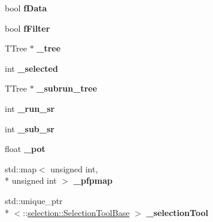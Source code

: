 \begin{DoxyCompactItemize}
\item 
\hypertarget{classNeutrinoSelectionFilter_a892272d67c27d81277fc16bc48ab451d}{bool {\bfseries f\-Data}}\label{classNeutrinoSelectionFilter_a892272d67c27d81277fc16bc48ab451d}

\item 
\hypertarget{classNeutrinoSelectionFilter_ae8811aa168d2e336c75e980a4dd2a2b8}{bool {\bfseries f\-Filter}}\label{classNeutrinoSelectionFilter_ae8811aa168d2e336c75e980a4dd2a2b8}

\item 
\hypertarget{classNeutrinoSelectionFilter_a4489c5bb4d7c9ff3002627bf6a4c28aa}{T\-Tree $\ast$ {\bfseries \-\_\-tree}}\label{classNeutrinoSelectionFilter_a4489c5bb4d7c9ff3002627bf6a4c28aa}

\item 
\hypertarget{classNeutrinoSelectionFilter_a50c00840d977534f08a8405d3b6db8a7}{int {\bfseries \-\_\-selected}}\label{classNeutrinoSelectionFilter_a50c00840d977534f08a8405d3b6db8a7}

\item 
\hypertarget{classNeutrinoSelectionFilter_a6fd2c4dbb3f1d6b4f618bde415bb10a6}{T\-Tree $\ast$ {\bfseries \-\_\-subrun\-\_\-tree}}\label{classNeutrinoSelectionFilter_a6fd2c4dbb3f1d6b4f618bde415bb10a6}

\item 
\hypertarget{classNeutrinoSelectionFilter_a057d305cb1ca799934c803b25f95ba33}{int {\bfseries \-\_\-run\-\_\-sr}}\label{classNeutrinoSelectionFilter_a057d305cb1ca799934c803b25f95ba33}

\item 
\hypertarget{classNeutrinoSelectionFilter_a67a30e788850a2ad92f084403b654e46}{int {\bfseries \-\_\-sub\-\_\-sr}}\label{classNeutrinoSelectionFilter_a67a30e788850a2ad92f084403b654e46}

\item 
\hypertarget{classNeutrinoSelectionFilter_ab1d8bff6417f53e7fcaaad1762d09c23}{float {\bfseries \-\_\-pot}}\label{classNeutrinoSelectionFilter_ab1d8bff6417f53e7fcaaad1762d09c23}

\item 
\hypertarget{classNeutrinoSelectionFilter_a151658388ac5141bb8f1925dbf056bb7}{std\-::map$<$ unsigned int, \\*
unsigned int $>$ {\bfseries \-\_\-pfpmap}}\label{classNeutrinoSelectionFilter_a151658388ac5141bb8f1925dbf056bb7}

\item 
\hypertarget{classNeutrinoSelectionFilter_ac0b82d00453b3f98cf15961ba7067f62}{std\-::unique\-\_\-ptr\\*
$<$\-::\hyperlink{classselection_1_1SelectionToolBase}{selection\-::\-Selection\-Tool\-Base} $>$ {\bfseries \-\_\-selection\-Tool}}\label{classNeutrinoSelectionFilter_ac0b82d00453b3f98cf15961ba7067f62}


\end{DoxyCompactItemize}
